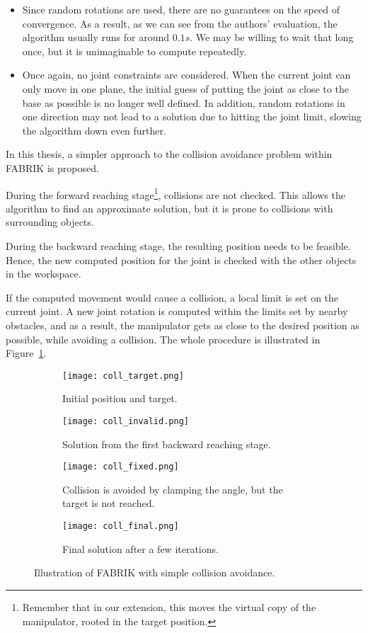 \begin{itemize}
\item Since random rotations are used, there are no guarantees on the speed of convergence. As a result, as we can see from the authors' evaluation, the algorithm usually runs for around $0.1s$. We may be willing to wait that long once, but it is unimaginable to compute repeatedly.
\item Once again, no joint constraints are considered. When the current joint can only move in one plane, the initial guess of putting the joint as close to the base as possible is no longer well defined. In addition, random rotations in one direction may not lead to a solution due to hitting the joint limit, slowing the algorithm down even further.
\end{itemize}

In this thesis, a simpler approach to the collision avoidance problem within FABRIK is proposed.


During the forward reaching stage\footnote{Remember that in our extension, this moves the virtual copy of the manipulator, rooted in the target position.}, collisions are not checked. This allows the algorithm to find an approximate solution, but it is prone to collisions with surrounding objects.


During the backward reaching stage, the resulting position needs to be feasible. Hence, the new computed position for the joint is checked with the other objects in the workspace.

If the computed movement would cause a collision, a local limit is set on the current joint. A new joint rotation is computed within the limits set by nearby obstacles, and as a result, the manipulator gets as close to the desired position as possible, while avoiding a collision. The whole procedure is illustrated in Figure~\ref{fig:coll}.

\begin{figure}[h]
    \centering
    \begin{subfigure}{.24\textwidth}
      \texttt{[image: coll\_target.png]}
      \caption{Initial position and target.}
    \end{subfigure}
    \begin{subfigure}{0.24\textwidth}
      \texttt{[image: coll\_invalid.png]}
      \caption{Solution from the first backward reaching stage.}
    \end{subfigure}
    \begin{subfigure}{.24\textwidth}
      \texttt{[image: coll\_fixed.png]}
      \caption{Collision is avoided by clamping the angle, but the target is not reached.}
    \end{subfigure}
    \begin{subfigure}{.24\textwidth}
      \texttt{[image: coll\_final.png]}
      \caption{Final solution after a few iterations.}
    \end{subfigure}
    \caption{Illustration of FABRIK with simple collision avoidance.}\label{fig:coll}
\end{figure}
  

